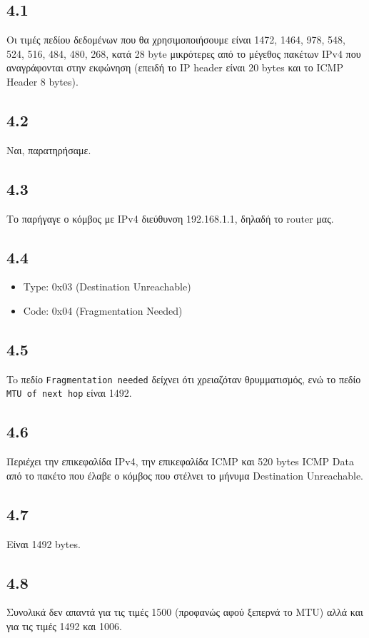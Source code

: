 		\subsection*{4.1}
			Οι τιμές πεδίου δεδομένων που θα χρησιμοποιήσουμε είναι 1472, 1464, 978, 548, 524, 516, 484, 480, 268, κατά 28 byte μικρότερες από το μέγεθος πακέτων IPv4 που αναγράφονται στην εκφώνηση (επειδή το IP header είναι 20 bytes και το ICMP Header 8 bytes).   

		\subsection*{4.2}
			Ναι, παρατηρήσαμε.

		\subsection*{4.3}
			Το παρήγαγε ο κόμβος με IPv4 διεύθυνση 192.168.1.1, δηλαδή το router μας.

		\subsection*{4.4}
			\begin{itemize}
				\item Type: 0x03 (Destination Unreachable)
				\item Code: 0x04 (Fragmentation Needed)
			\end{itemize}

		\subsection*{4.5}
			To πεδίο \verb|Fragmentation needed| δείχνει ότι χρειαζόταν θρυμματισμός, ενώ το πεδίο \verb|MTU of next hop| είναι 1492.

		\subsection*{4.6}
			Περιέχει την επικεφαλίδα IPv4, την επικεφαλίδα ICMP και 520 bytes ICMP Data από το πακέτο που έλαβε ο κόμβος που στέλνει το μήνυμα Destination Unreachable.

		\subsection*{4.7}
			Είναι 1492 bytes.

		\subsection*{4.8}
			Συνολικά δεν απαντά για τις τιμές 1500 (προφανώς αφού ξεπερνά το MTU) αλλά και για τις τιμές 1492 και 1006.

